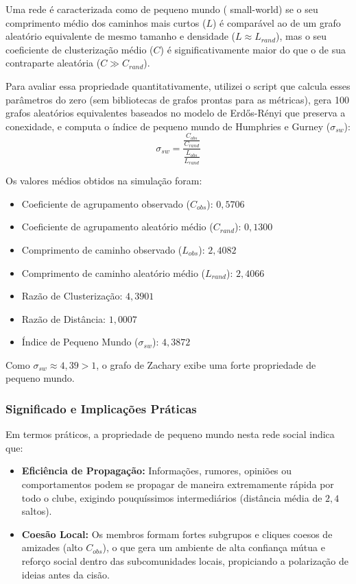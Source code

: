 \documentclass[sigconf]{webmedia}
\begin{document}
Uma rede é caracterizada como de pequeno mundo ( {small-world}) se o seu comprimento médio dos caminhos mais curtos ($L$) é comparável ao de um grafo aleatório equivalente de mesmo tamanho e densidade ($L \approx L_{rand}$), mas o seu coeficiente de clusterização médio ($C$) é significativamente maior do que o de sua contraparte aleatória ($C \gg C_{rand}$).

Para avaliar essa propriedade quantitativamente, utilizei o script  que calcula esses parâmetros do zero (sem bibliotecas de grafos prontas para as métricas), gera 100 grafos aleatórios equivalentes baseados no modelo de Erdős-Rényi que preserva a conexidade, e computa o índice de pequeno mundo de Humphries e Gurney ($\sigma_{sw}$):
\begin{equation}
    \sigma_{sw} = \frac{\frac{C_{obs}}{C_{rand}}}{\frac{L_{obs}}{L_{rand}}}
\end{equation}

Os valores médios obtidos na simulação foram:
\begin{itemize}
    \item Coeficiente de agrupamento observado ($C_{obs}$): $0,5706$
    \item Coeficiente de agrupamento aleatório médio ($C_{rand}$): $0,1300$
    \item Comprimento de caminho observado ($L_{obs}$): $2,4082$
    \item Comprimento de caminho aleatório médio ($L_{rand}$): $2,4066$
    \item Razão de Clusterização: $4,3901$
    \item Razão de Distância: $1,0007$
    \item Índice de Pequeno Mundo ($\sigma_{sw}$): $4,3872$
\end{itemize}

Como $\sigma_{sw} \approx 4,39 > 1$, o grafo de Zachary exibe uma forte propriedade de pequeno mundo.

\subsubsection{Significado e Implicações Práticas}
Em termos práticos, a propriedade de pequeno mundo nesta rede social indica que:
\begin{itemize}
    \item \textbf{Eficiência de Propagação:} Informações, rumores, opiniões ou comportamentos podem se propagar de maneira extremamente rápida por todo o clube, exigindo pouquíssimos intermediários (distância média de $2,4$ saltos).
    \item \textbf{Coesão Local:} Os membros formam fortes subgrupos e cliques coesos de amizades (alto $C_{obs}$), o que gera um ambiente de alta confiança mútua e reforço social dentro das subcomunidades locais, propiciando a polarização de ideias antes da cisão.
\end{itemize}
\end{document}
